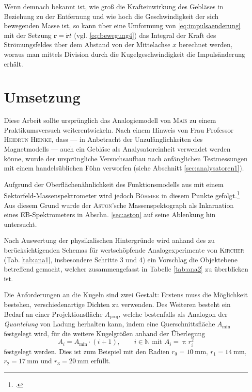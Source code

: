 Wenn demnach bekannt ist, wie groß die Krafteinwirkung des Gebläses in Beziehung zu der Entfernung und wie hoch die Geschwindigkeit der sich bewegenden Masse ist, so kann über eine Umformung von \eqref{eq:impulsaenderung} mit der Setzung $\boldsymbol{r}=\boldsymbol{\dot{r}}t$ (vgl. \eqref{eq:bewegung4}) das Integral der Kraft des Strömungsfeldes über dem Abstand von der Mittelachse $x$ berechnet werden, woraus man mittels Division durch die Kugelgeschwindigkeit die Impulsänderung erhält.

\section{Umsetzung}
\label{sec:umsetzung}
Diese Arbeit sollte ursprünglich das Analogiemodell von \textsc{Mais} zu einem Praktikumsversuch weiterentwickeln. Nach einem Hinweis von Frau Professor \textsc{Heidrun Heinke}, dass --- in Anbetracht der Unzulänglichkeiten des Magnetmodells --- auch ein Gebläse als Analysatoreinheit verwendet werden könne, wurde der ursprüngliche Versuchsaufbau nach anfänglichen Testmessungen mit einem handelsüblichen Föhn verworfen (siehe Abschnitt \ref{sec:analysatoren1}).

Aufgrund der Oberflächenähnlichkeit des Funktionsmodells aus \textcite{Schilling1987} mit einem Sektorfeld-Massenspektrometer wird jedoch \textsc{Böhmer} in diesem Punkte gefolgt.\vspace*{-0.4cm}\footcite[vgl. die ausführliche Begründung bei][S.\,26--27]{Boehmer2013}\vspace*{0.4cm} Aus diesem Grund wurde der \textsc{Aston}'sche Massenspektograph als Inkarnation eines EB-Spek{\-}tro{\-}me{\-}ters in Abschn. \ref{sec:aston} auf seine Ablenkung hin untersucht. 

Nach Auswertung der physikalischen Hintergründe wird anhand des zu berücksichtigenden Schemas für wertschöpfende Analogexperimente von \textsc{Kircher} (Tab.\,\ref{tab:ana1}, insbesondere Schritte 3 und 4)  ein Vorschlag die Objektebene betreffend gemacht, welcher zusammengefasst in Tabelle \ref{tab:ana2} zu überblicken ist.



\noindent Die Anforderungen an die Kugeln sind zwei Gestalt: Erstens muss die Möglichkeit bestehen, verschiedenartige Dichten zu verwenden. Des Weiteren besteht ein Bedarf an einer Projektionsfläche $A_\mathrm{proj}$, welche bestenfalls als Analogon der \textit{Quantelung} von Ladung herhalten kann, indem eine Querschnittsfläche $A_\mathrm{min}$ festgelegt wird, für die weitere Kugelgrößen anhand der Überlegung
\begin{equation}
\label{eq:umsetzung1}
A_i=A_\mathrm{min}\cdot (i+1),\qquad i \in \mathbb{N}\text{ mit }A_i=\uppi r_i^2 
\end{equation} 
festgelegt werden. Dies ist zum Beispiel mit den Radien $r_0=\SI{10}{\milli\metre}$, $r_1=\SI{14}{\milli\metre}$, $r_2=\SI{17}{\milli\metre}$ und $r_3=\SI{20}{\milli\metre}$ erfüllt.

